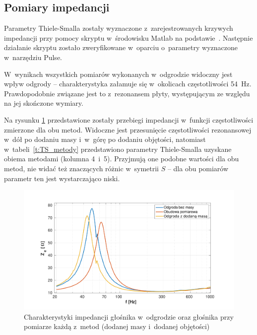 \documentclass[12pt]{oska}
\begin{document}
	\subsection{Pomiary impedancji}
		
		Parametry Thiele-Smalla zostały wyznaczone z~zarejestrowanych krzywych impedancji przy pomocy skryptu w~środowisku Matlab na podstawie~\cite{dobrucki}. Następnie działanie skryptu zostało zweryfikowane w~oparciu o~parametry wyznaczone w~narzędziu Pulse. 
		
		W~wynikach wszystkich pomiarów wykonanych w~odgrodzie widoczny jest wpływ odgrody -- charakterystyka załamuje się w~okolicach częstotliwości \SI{54}{\hertz}. Prawdopodobnie związane jest to z~rezonansem płyty, występującym ze względu na jej skończone wymiary.
		
		Na rysunku \ref{r:metody} przedstawione zostały przebiegi impedancji w~funkcji częstotliwości zmierzone dla obu metod. Widoczne jest przesunięcie częstotliwości rezonansowej w~dół po dodaniu masy i~w~górę po dodaniu objętości, natomiast w~tabeli~\ref{t:TS_metody} przedstawiono parametry Thiele-Smalla uzyskane obiema metodami (kolumna 4~i~5). Przyjmują one podobne wartości dla obu metod, nie widać też znaczących różnic w~symetrii $S$ -- dla obu pomiarów parametr ten jest wystarczająco niski.
		
		\begin{figure}[!ht]
			\centering
			\includegraphics[width=.8\textwidth,trim={2cm .5cm 2cm 1cm},clip]{metody_2glosnik.pdf}
			\caption{Charakterystyki impedancji głośnika w~odgrodzie oraz głośnika przy pomiarze każdą z~metod (dodanej masy i~dodanej objętości)}
			\label{r:metody}
		\end{figure}
		
\end{document}
